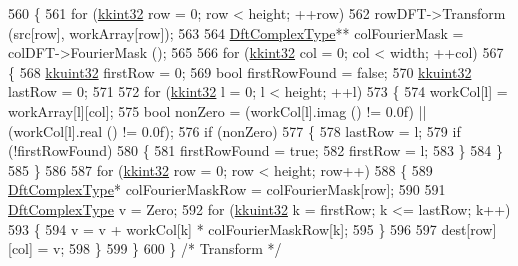 \begin{DoxyCode}
560   \{
561     \textcolor{keywordflow}{for}  (\hyperlink{namespace_k_k_b_a8fa4952cc84fda1de4bec1fbdd8d5b1b}{kkint32} row = 0;  row < height;  ++row)
562       rowDFT->Transform (src[row], workArray[row]);
563 
564     \hyperlink{class_k_k_b_1_1_k_k___d_f_t2_d_a3277abaea54d0d88958f030092b9ac38}{DftComplexType}**  colFourierMask = colDFT->FourierMask ();
565 
566     \textcolor{keywordflow}{for}  (\hyperlink{namespace_k_k_b_a8fa4952cc84fda1de4bec1fbdd8d5b1b}{kkint32} col = 0;  col < width;  ++col)
567     \{
568       \hyperlink{namespace_k_k_b_af8d832f05c54994a1cce25bd5743e19a}{kkuint32}  firstRow = 0;
569       \textcolor{keywordtype}{bool}    firstRowFound = \textcolor{keyword}{false};
570       \hyperlink{namespace_k_k_b_af8d832f05c54994a1cce25bd5743e19a}{kkuint32}  lastRow = 0;
571 
572       \textcolor{keywordflow}{for}  (\hyperlink{namespace_k_k_b_a8fa4952cc84fda1de4bec1fbdd8d5b1b}{kkint32} l = 0;  l < height;  ++l)
573       \{
574         workCol[l] = workArray[l][col];
575         \textcolor{keywordtype}{bool}  nonZero = (workCol[l].imag () != 0.0f)  ||  (workCol[l].real () != 0.0f);
576         \textcolor{keywordflow}{if}  (nonZero)
577         \{
578           lastRow = l;
579           \textcolor{keywordflow}{if}  (!firstRowFound)
580           \{
581             firstRowFound = \textcolor{keyword}{true};
582             firstRow = l;
583           \}
584         \}
585       \}
586 
587       \textcolor{keywordflow}{for}  (\hyperlink{namespace_k_k_b_a8fa4952cc84fda1de4bec1fbdd8d5b1b}{kkint32}  row = 0;  row < height;  row++)
588       \{
589         \hyperlink{class_k_k_b_1_1_k_k___d_f_t2_d_a3277abaea54d0d88958f030092b9ac38}{DftComplexType}*  colFourierMaskRow = colFourierMask[row];
590 
591         \hyperlink{class_k_k_b_1_1_k_k___d_f_t2_d_a3277abaea54d0d88958f030092b9ac38}{DftComplexType}  v = Zero;
592         \textcolor{keywordflow}{for}  (\hyperlink{namespace_k_k_b_af8d832f05c54994a1cce25bd5743e19a}{kkuint32} k = firstRow;  k <= lastRow;  k++)
593         \{
594           v = v  + workCol[k] * colFourierMaskRow[k];
595         \}
596 
597         dest[row][col] = v;
598       \}
599     \}
600   \}  \textcolor{comment}{/* Transform */}
\end{DoxyCode}
